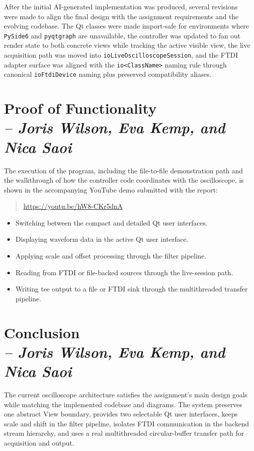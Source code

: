 After the initial AI-generated implementation was produced, several revisions were made to align the final design with the assignment requirements and the evolving codebase. The Qt classes were made import-safe for environments where \texttt{PySide6} and \texttt{pyqtgraph} are unavailable, the controller was updated to fan out render state to both concrete views while tracking the active visible view, the live acquisition path was moved into \texttt{ioLiveOscilloscopeSession}, and the FTDI adapter surface was aligned with the \texttt{io<ClassName>} naming rule through canonical \texttt{ioFtdiDevice} naming plus preserved compatibility aliases.

\section{Proof of Functionality \\
\small{\textit{-- Joris Wilson, Eva Kemp, and Nica Saoi}}}
\label{Section::Proof of Functionality}

The execution of the program, including the file-to-file demonstration path and the walkthrough of how the controller code coordinates with the oscilloscope, is shown in the accompanying YouTube demo submitted with the report:

\begin{quote}
\url{https://youtu.be/hW8-CKr5dnA}
\end{quote}

\begin{itemize}
    \item Switching between the compact and detailed Qt user interfaces.
    \item Displaying waveform data in the active Qt user interface.
    \item Applying scale and offset processing through the filter pipeline.
    \item Reading from FTDI or file-backed sources through the live-session path.
    \item Writing tee output to a file or FTDI sink through the multithreaded transfer pipeline.
\end{itemize}

\section{Conclusion \\
\small{\textit{-- Joris Wilson, Eva Kemp, and Nica Saoi}}}
\label{Section::Conclusion}

The current oscilloscope architecture satisfies the assignment's main design goals while matching the implemented codebase and diagrams. The system preserves one abstract View boundary, provides two selectable Qt user interfaces, keeps scale and shift in the filter pipeline, isolates FTDI communication in the backend stream hierarchy, and uses a real multithreaded circular-buffer transfer path for acquisition and output.

